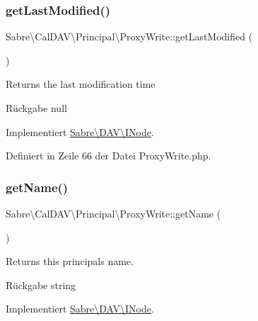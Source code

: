 \subsubsection{\texorpdfstring{get\+Last\+Modified()}{getLastModified()}}
{\footnotesize\ttfamily Sabre\textbackslash{}\+Cal\+D\+A\+V\textbackslash{}\+Principal\textbackslash{}\+Proxy\+Write\+::get\+Last\+Modified (\begin{DoxyParamCaption}{ }\end{DoxyParamCaption})}

Returns the last modification time

\begin{DoxyReturn}{Rückgabe}
null 
\end{DoxyReturn}


Implementiert \mbox{\hyperlink{interface_sabre_1_1_d_a_v_1_1_i_node_a06335f81c7d4ec2c6d9e327c8ce61014}{Sabre\textbackslash{}\+D\+A\+V\textbackslash{}\+I\+Node}}.



Definiert in Zeile 66 der Datei Proxy\+Write.\+php.

\mbox{\label{class_sabre_1_1_cal_d_a_v_1_1_principal_1_1_proxy_write_ae8c0d45f465c721ad1bb0469465bea74}} 
\subsubsection{\texorpdfstring{get\+Name()}{getName()}}
{\footnotesize\ttfamily Sabre\textbackslash{}\+Cal\+D\+A\+V\textbackslash{}\+Principal\textbackslash{}\+Proxy\+Write\+::get\+Name (\begin{DoxyParamCaption}{ }\end{DoxyParamCaption})}

Returns this principals name.

\begin{DoxyReturn}{Rückgabe}
string 
\end{DoxyReturn}


Implementiert \mbox{\hyperlink{interface_sabre_1_1_d_a_v_1_1_i_node_ab616fe836b1ae36af12126a2bc934dce}{Sabre\textbackslash{}\+D\+A\+V\textbackslash{}\+I\+Node}}.



